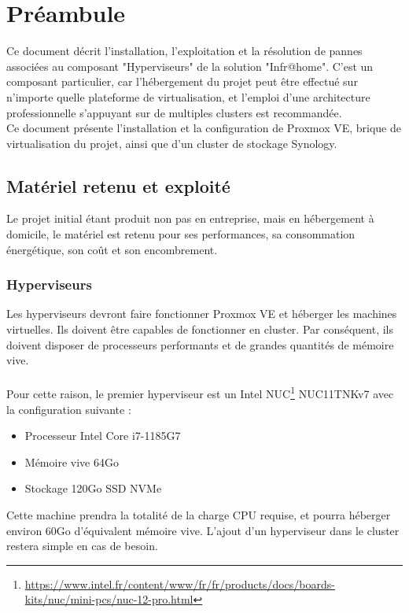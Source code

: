 \section{Préambule}
Ce document décrit l'installation, l'exploitation et la résolution de pannes associées au composant "Hyperviseurs" de la solution "Infr@home". C'est un composant particulier, car l'hébergement du projet peut être effectué sur n'importe quelle plateforme de virtualisation, et l'emploi d'une architecture professionnelle s'appuyant sur de multiples clusters est recommandée.\\

Ce document présente l'installation et la configuration de Proxmox VE, brique de virtualisation du projet, ainsi que d'un cluster de stockage Synology.\\

\subsection{Matériel retenu et exploité}
Le projet initial étant produit non pas en entreprise, mais en hébergement à domicile, le matériel est retenu pour ses performances, sa consommation énergétique, son coût et son encombrement.\\

\subsubsection{Hyperviseurs}
Les hyperviseurs devront faire fonctionner Proxmox VE et héberger les machines virtuelles. Ils doivent être capables de fonctionner en cluster. Par conséquent, ils doivent disposer de processeurs performants et de grandes quantités de mémoire vive.\\
~\\
Pour cette raison, le premier hyperviseur est un Intel NUC\footnote{\url{https://www.intel.fr/content/www/fr/fr/products/docs/boards-kits/nuc/mini-pcs/nuc-12-pro.html}} NUC11TNKv7 avec la configuration suivante :
\begin{itemize}
    \item Processeur Intel Core i7-1185G7
    \item Mémoire vive 64Go
    \item Stockage 120Go SSD NVMe
\end{itemize}

Cette machine prendra la totalité de la charge CPU requise, et pourra héberger environ 60Go d'équivalent mémoire vive. L'ajout d'un hyperviseur dans le cluster restera simple en cas de besoin.\\

